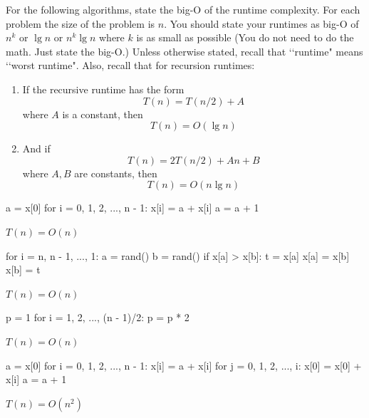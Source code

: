 

\LATEXHELPTHREEFIVEZERO

For the following algorithms, state the big-O of the runtime complexity.
For each problem the size of the problem is $n$.
You should state your runtimes as
big-O of $n^k$
or $\lg n$ or $n^k \lg n$
where $k$ is as small as possible
(You do not need to do the math. Just state the big-O.)
Unless otherwise stated, recall that \lq\lq runtime" means \lq\lq worst
runtime".
Also, recall that for recursion runtimes:
\begin{enumerate}[nosep]
\item If the recursive runtime has the form
\[
T(n) = T(n/2) + A
\]
where $A$ is a constant, then
\[
T(n) = O(\lg n)
\]
\item And if
\[
T(n) = 2T(n/2) + An + B
\]
where $A,B$ are constants, then
\[
T(n) = O(n \lg n)
\]
\end{enumerate}

\TURNPAGE
\newpage

\nextq
\begin{console}[fontsize=\small]
a = x[0]
for i = 0, 1, 2, ..., n - 1:
    x[i] = a + x[i]
    a = a + 1
\end{console}
\ANSWER
\begin{answerlong}
$T(n) = O(n)$
\end{answerlong}

\nextq
\begin{console}[fontsize=\small]
for i = n, n - 1, ..., 1:
    a = rand() %
    b = rand() %
    if x[a] > x[b]:
        t = x[a]
        x[a] = x[b]
        x[b] = t
\end{console}
\ANSWER
\begin{answerlong}
$T(n) = O(n)$
\end{answerlong}

\nextq
\begin{console}[fontsize=\small]
p = 1
for i = 1, 2, ..., (n - 1)/2:
    p = p * 2
\end{console}
\ANSWER
\begin{answerlong}
$T(n) = O(n)$
\end{answerlong}

\nextq
\begin{console}[fontsize=\small]
a = x[0]
for i = 0, 1, 2, ..., n - 1:
    x[i] = a + x[i]
    for j = 0, 1, 2, ..., i:
        x[0] = x[0] + x[i]
    a = a + 1
\end{console}
\ANSWER
\begin{answerlong}
$T(n) = O(n^2)$
\end{answerlong}

